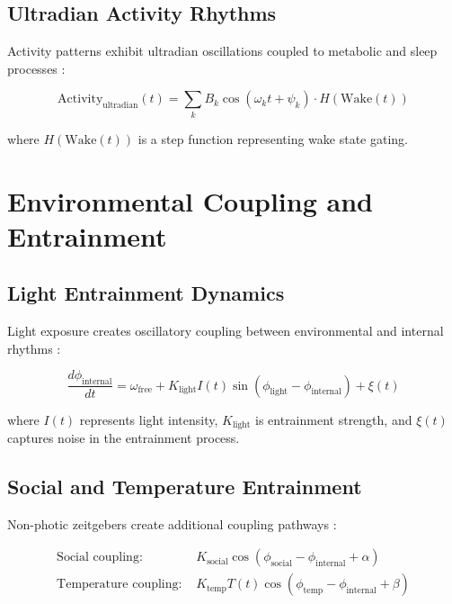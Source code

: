 \documentclass[twocolumn]{article}
\begin{document}
\subsection{Ultradian Activity Rhythms}

Activity patterns exhibit ultradian oscillations coupled to metabolic and sleep processes \citep{lavie1985ultradian}:

\begin{equation}
\text{Activity}_{\text{ultradian}}(t) = \sum_{k} B_k \cos(\omega_k t + \psi_k) \cdot H(\text{Wake}(t))
\label{eq:ultradian_activity}
\end{equation}

where $H(\text{Wake}(t))$ is a step function representing wake state gating.

\section{Environmental Coupling and Entrainment}

\subsection{Light Entrainment Dynamics}

Light exposure creates oscillatory coupling between environmental and internal rhythms \citep{roenneberg2007plasticity}:

\begin{equation}
\frac{d\phi_{\text{internal}}}{dt} = \omega_{\text{free}} + K_{\text{light}} I(t) \sin(\phi_{\text{light}} - \phi_{\text{internal}}) + \xi(t)
\label{eq:light_entrainment}
\end{equation}

where $I(t)$ represents light intensity, $K_{\text{light}}$ is entrainment strength, and $\xi(t)$ captures noise in the entrainment process.

\subsection{Social and Temperature Entrainment}

Non-photic zeitgebers create additional coupling pathways \citep{mistlberger2005social}:

\begin{align}
\text{Social coupling: } &K_{\text{social}} \cos(\phi_{\text{social}} - \phi_{\text{internal}} + \alpha) \label{eq:social_coupling} \\
\text{Temperature coupling: } &K_{\text{temp}} T(t) \cos(\phi_{\text{temp}} - \phi_{\text{internal}} + \beta) \label{eq:temp_coupling}
\end{align}
\end{document}
